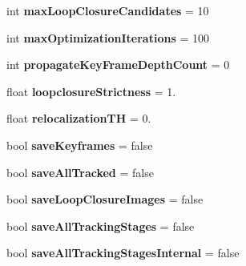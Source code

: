 \begin{DoxyCompactItemize}
\item 
\hypertarget{namespacelsd__slam_aeb49b9a83c9c151b3ce4ca4ca0e9981b}{int {\bfseries max\-Loop\-Closure\-Candidates} = 10}\label{namespacelsd__slam_aeb49b9a83c9c151b3ce4ca4ca0e9981b}

\item 
\hypertarget{namespacelsd__slam_a38428ef9b24d6b2e31a2813abb355f0a}{int {\bfseries max\-Optimization\-Iterations} = 100}\label{namespacelsd__slam_a38428ef9b24d6b2e31a2813abb355f0a}

\item 
\hypertarget{namespacelsd__slam_a8dac8641a0b7e985524d53cfdc459f42}{int {\bfseries propagate\-Key\-Frame\-Depth\-Count} = 0}\label{namespacelsd__slam_a8dac8641a0b7e985524d53cfdc459f42}

\item 
\hypertarget{namespacelsd__slam_aff2973e7c908eecc7179182f48549b79}{float {\bfseries loopclosure\-Strictness} = 1.}\label{namespacelsd__slam_aff2973e7c908eecc7179182f48549b79}

\item 
\hypertarget{namespacelsd__slam_acf3dc1f9ec3f9f5e03c54c750afde3c5}{float {\bfseries relocalization\-T\-H} = 0.}\label{namespacelsd__slam_acf3dc1f9ec3f9f5e03c54c750afde3c5}

\item 
\hypertarget{namespacelsd__slam_ad3618b1e1a271e35abc107c738036322}{bool {\bfseries save\-Keyframes} = false}\label{namespacelsd__slam_ad3618b1e1a271e35abc107c738036322}

\item 
\hypertarget{namespacelsd__slam_a53de8374d3bda8a9841e1b1e5074b4e5}{bool {\bfseries save\-All\-Tracked} = false}\label{namespacelsd__slam_a53de8374d3bda8a9841e1b1e5074b4e5}

\item 
\hypertarget{namespacelsd__slam_af257cd3dc07235aa2817474de5187b5c}{bool {\bfseries save\-Loop\-Closure\-Images} = false}\label{namespacelsd__slam_af257cd3dc07235aa2817474de5187b5c}

\item 
\hypertarget{namespacelsd__slam_a9fa62d5c721b6508743d148788c0d297}{bool {\bfseries save\-All\-Tracking\-Stages} = false}\label{namespacelsd__slam_a9fa62d5c721b6508743d148788c0d297}

\item 
\hypertarget{namespacelsd__slam_adff379e33015589afef2faec05eeaafb}{bool {\bfseries save\-All\-Tracking\-Stages\-Internal} = false}\label{namespacelsd__slam_adff379e33015589afef2faec05eeaafb}


\end{DoxyCompactItemize}
